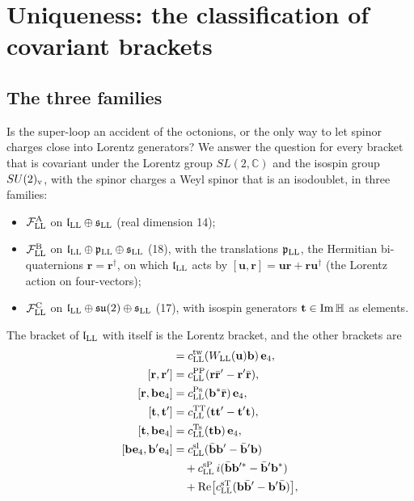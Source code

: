 \section{Uniqueness: the classification of covariant brackets}
\label{sec:classification}

\subsection{The three families}

Is the super-loop an accident of the octonions, or the only way to let spinor charges close into
Lorentz generators? We answer the question for every bracket that is covariant under the Lorentz group
$SL(2,\mathbb C)$ and the isospin group $SU(2)_{\rm v}$, with the spinor charges a Weyl spinor that is an
isodoublet, in three families:
\begin{itemize}
\item $\mathcal F^{\rm A}_{\rm LL}$ on $\mathfrak l_{\rm LL}\oplus\mathfrak s_{\rm LL}$ (real dimension 14);
\item $\mathcal F^{\rm B}_{\rm LL}$ on $\mathfrak l_{\rm LL}\oplus\mathfrak p_{\rm LL}\oplus\mathfrak s_{\rm LL}$
(18), with the translations $\mathfrak p_{\rm LL}$, the Hermitian bi-quaternions $\mathbf r=\mathbf
r^\dagger$, on which $\mathfrak l_{\rm LL}$ acts by $[\mathbf u,\mathbf r]=\mathbf u\mathbf r+\mathbf
r\mathbf u^\dagger$ (the Lorentz action on four-vectors);
\item $\mathcal F^{\rm C}_{\rm LL}$ on $\mathfrak l_{\rm LL}\oplus\mathfrak{su}(2)\oplus\mathfrak s_{\rm
LL}$ (17), with isospin generators $\mathbf t\in{\rm Im}\,\mathbb H$ as elements.
\end{itemize}
The bracket of $\mathfrak l_{\rm LL}$ with itself is the Lorentz bracket, and the other brackets are
\begin{align}
[\mathbf u,\mathbf b\mathbf e_4]&=c^{\rm tw}_{\rm LL}(W_{\rm LL}(\mathbf u)\mathbf b)\,\mathbf e_4,\nonumber\\
[\mathbf r,\mathbf r']&=c^{\rm PP}_{\rm LL}(\mathbf r\bar{\mathbf r}'-\mathbf r'\bar{\mathbf r}),\nonumber\\
[\mathbf r,\mathbf b\mathbf e_4]&=c^{\rm Ps}_{\rm LL}(\mathbf b^*\bar{\mathbf r})\,\mathbf e_4,\nonumber\\
[\mathbf t,\mathbf t']&=c^{\rm TT}_{\rm LL}(\mathbf t\mathbf t'-\mathbf t'\mathbf t),\label{eq:families}\\
[\mathbf t,\mathbf b\mathbf e_4]&=c^{\rm Ts}_{\rm LL}(\mathbf t\mathbf b)\,\mathbf e_4,\nonumber\\
[\mathbf b\mathbf e_4,\mathbf b'\mathbf e_4]&=c^{\rm sl}_{\rm LL}(\bar{\mathbf b}\mathbf b'-\bar{\mathbf b}'\mathbf b)\nonumber\\
&\quad+c^{\rm sP}_{\rm LL}\,i(\bar{\mathbf b}\mathbf b'^*-\bar{\mathbf b}'\mathbf b^*)\nonumber\\
&\quad+\mathrm{Re}\big[c^{\rm sT}_{\rm LL}(\mathbf b\bar{\mathbf b}'-\mathbf b'\bar{\mathbf b})\big],\nonumber
\end{align}

